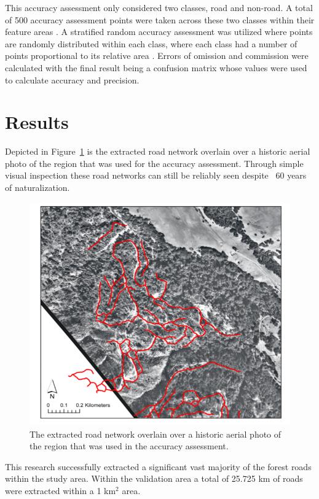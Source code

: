 \documentclass[remotesensing,article,submit,pdftex,moreauthors]{Definitions/mdpi}
\begin{document}
This accuracy assessment only considered two classes, road and non-road.  A total of 500 accuracy assessment points were taken across these two classes within their feature areas \cite{guillen, lillesand}. A stratified random accuracy assessment was utilized where points are randomly distributed within each class, where each class had a number of points proportional to its relative area \cite{foody}. Errors of omission and commission were calculated with the final result being a confusion matrix whose values were used to calculate accuracy and precision.
\section{Results}
Depicted in Figure~\ref{fig8} is the extracted road network overlain over a historic aerial photo of the region that was used for the accuracy assessment. Through simple visual inspection these road networks can still be reliably seen despite ~60 years of naturalization.

\begin{figure}[H]
\includegraphics[width=10.5 cm]{roads.png}
\caption{The extracted road network overlain over a historic aerial photo of the region that was used in the accuracy assessment. \label{fig8}}
\end{figure}   


This research successfully extracted a significant vast majority of the forest roads within the study area. Within the validation area a total of 25.725 km of roads were extracted within a 1 km$^2$ area. 
\end{document}

